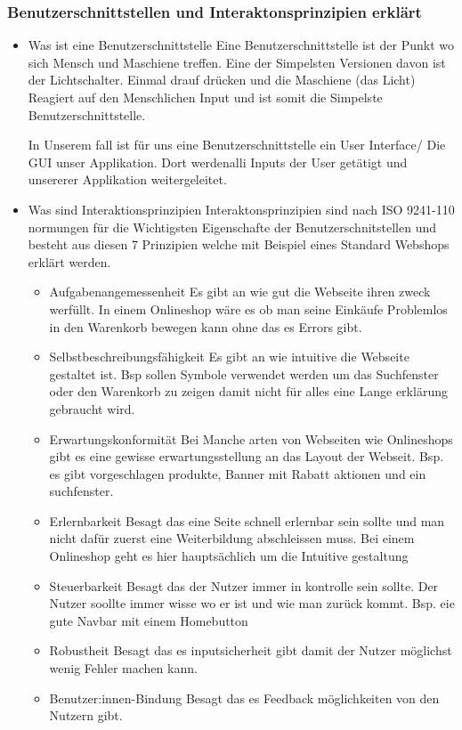 \documentclass[10pt]{article}
\begin{document}
	\subsubsection [Benuzterschnitstellen und Interaktonsprinzipien erkläret] {Benutzerschnittstellen und Interaktonsprinzipien erklärt}
	\begin{itemize}
		\item Was ist eine Benutzerschnittstelle
		\subitem Eine Benutzerschnittstelle ist der Punkt wo sich Mensch und Maschiene treffen. Eine der Simpelsten Versionen davon ist der Lichtschalter. Einmal drauf drücken und die Maschiene (das Licht) Reagiert auf den Menschlichen Input und ist somit die Simpelste Benutzerschnittstelle.
		
		In Unserem fall ist für uns eine Benutzerschnittstelle ein User Interface/ Die GUI unser Applikation. Dort werdenalli Inputs der User getätigt und unsererer Applikation weitergeleitet.
		
		\item Was sind Interaktionsprinzipien
		\subitem Interaktonsprinzipien sind nach ISO 9241-110 normungen für die Wichtigsten Eigenschafte der Benutzerschnitstellen und besteht aus diesen 7 Prinzipien welche mit Beispiel eines Standard Webshops erklärt werden.
		\begin{itemize}
			\item Aufgabenangemessenheit
			\subitem Es gibt an wie gut die Webseite ihren zweck werfüllt. In einem Onlineshop wäre es ob man seine Einkäufe Problemlos in den Warenkorb bewegen kann ohne das es Errors gibt.
			\item Selbstbeschreibungsfähigkeit
			\subitem Es gibt an wie intuitive die Webseite gestaltet ist. Bsp sollen Symbole verwendet werden um das Suchfenster oder den Warenkorb zu zeigen damit nicht für alles eine Lange erklärung gebraucht wird.
			\item Erwartungskonformität
			\subitem Bei Manche arten von Webseiten wie Onlineshops gibt es eine gewisse erwartungsstellung an das Layout der Webseit. Bsp. es gibt vorgeschlagen produkte, Banner mit Rabatt aktionen und ein suchfenster.
			\item Erlernbarkeit
			\subitem Besagt das eine Seite schnell erlernbar sein sollte und man nicht dafür zuerst eine Weiterbildung abschleissen muss. Bei einem Onlineshop geht es hier hauptsächlich um die Intuitive gestaltung
			\item Steuerbarkeit
			\subitem Besagt das der Nutzer immer in kontrolle sein sollte. Der Nutzer soollte immer wisse wo er ist und wie man zurück kommt. Bsp. eie gute Navbar mit einem Homebutton
			\item Robustheit
			\subitem Besagt das es inputsicherheit gibt damit der Nutzer möglichst wenig Fehler machen kann.
			\item Benutzer:innen-Bindung
			\subitem Besagt das es Feedback möglichkeiten von den Nutzern gibt.
		\end{itemize}
	\end{itemize}
\end{document}
